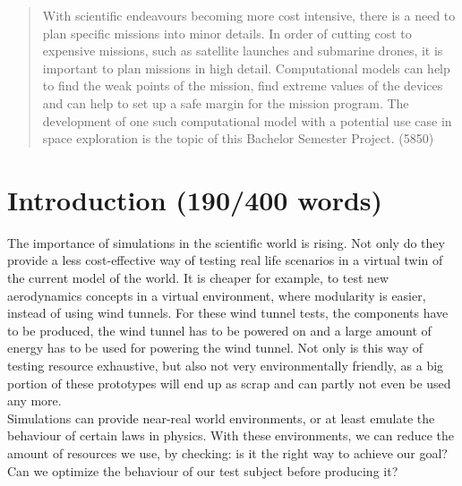 \documentclass[conference,compsoc]{IEEEtran}
\begin{document}




\maketitle


\begin{abstract}
With scientific endeavours becoming more cost intensive, there is a need to plan specific missions into minor details. In order of cutting cost to expensive missions, such as satellite launches and submarine drones, it is important to plan missions in high detail. Computational models can help to find the weak points of the mission, find extreme values of the devices and can help to set up a safe margin for the mission program. The development of one such computational model with a potential use case in space exploration is the topic of this Bachelor Semester Project. (5850)
\end{abstract}


%
\IEEEpeerreviewmaketitle


\section{Introduction (190/400 words)}
The importance of simulations in the scientific world is rising. Not only do they provide a less cost-effective way of testing real life scenarios in a virtual twin of the current model of the world. It is cheaper for example, to test new aerodynamics concepts in a virtual environment, where modularity is easier, instead of using wind tunnels. For these wind tunnel tests, the components have to be produced, the wind tunnel has to be powered on and a large amount of energy has to be used for powering the wind tunnel. Not only is this way of testing resource exhaustive, but also not very environmentally friendly, as a big portion of these prototypes will end up as scrap and can partly not even be used any more.  \\
Simulations can provide near-real world environments, or at least emulate the behaviour of certain laws in physics. With these environments, we can reduce the amount of resources we use, by checking: is it the right way to achieve our goal? Can we optimize the behaviour of our test subject before producing it? 
\end{document}
